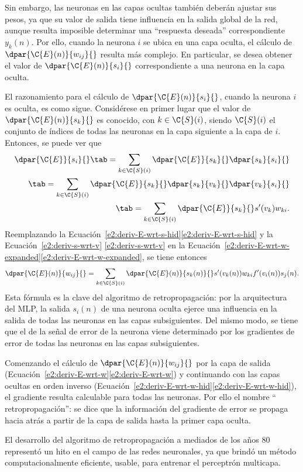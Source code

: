 Sin embargo, las neuronas en las capas ocultas también deberán ajustar
sus pesos, ya que su valor de salida tiene influencia en la salida
global de la red, aunque resulta imposible determinar una ``respuesta
deseada'' correspondiente $y_k(n)$.  Por ello, cuando la neurona $i$
se ubica en una capa oculta, el cálculo de $\dpar{\C{E}(n)}{w_{ij}}{}$
resulta más complejo.  En particular, se desea obtener el valor de
$\dpar{\C{E}(n)}{s_i}{}$ correspondiente a una neurona en la capa
oculta.

El razonamiento para el cálculo de $\dpar{\C{E}(n)}{s_{i}}{}$, cuando
la neurona $i$ es oculta, es como sigue. Considérese en primer lugar
que el valor de $\dpar{\C{E}(n)}{s_k}{}$ es conocido, con
$k\in{}\C{S}(i)$, siendo $\C{S}(i)$ el conjunto de índices de todas
las neuronas en la capa siguiente a la capa de $i$.  Entonces, se
puede ver que
%
\begin{align}
  \dpar{\C{E}}{s_i}{} \tab= \sum_{k\in\C{S}(i)}
      \dpar{\C{E}}{s_k}{}\dpar{s_k}{s_i}{} \notag\\
    \tab= \sum_{k\in\C{S}(i)}
      \dpar{\C{E}}{s_k}{}\dpar{s_k}{v_k}{}\dpar{v_k}{s_i}{} \notag\\
    \tab= \sum_{k\in\C{S}(i)} \dpar{\C{E}}{s_k}{} s'(v_k) w_{ki}.
    \label{e2:deriv-E-wrt-s-hid}
\end{align}
%
Reemplazando la
\iflatexml{}Ecuación~\ref{e2:deriv-E-wrt-s-hid}\else\autoref{e2:deriv-E-wrt-s-hid}\fi{}
y la \iflatexml{}Ecuación~\ref{e2:deriv-s-wrt-v}
\else\autoref{e2:deriv-s-wrt-v}\fi{} en la 
\iflatexml{}Ecuación~\ref{e2:deriv-E-wrt-w-expanded}\else\autoref{e2:deriv-E-wrt-w-expanded}\fi,
se tiene entonces
%
\begin{align}\label{e2:deriv-E-wrt-w-hid}
  \dpar{\C{E}(n)}{w_{ij}}{} =
  \sum_{k\in\C{S}(i)} \dpar{\C{E}(n)}{s_k(n)}{} s'(v_k(n)) w_{ki}
  f'(v_i(n)) s_j(n).
\end{align}
%
Esta fórmula es la clave del algoritmo de retropropagación: por la
arquitectura del MLP, la salida $s_i(n)$ de una neurona oculta ejerce
una influencia en la salida de todas las neuronas en las capas
subsiguientes.  Del mismo modo, se tiene que el  de
la señal de error de la neurona viene determinado por los gradientes
de error de todas las neuronas en las capas subsiguientes.

Comenzando el cálculo de $\dpar{\C{E}(n)}{w_{ij}}{}$ por la capa de
salida
(\iflatexml{}Ecuación~\ref{e2:deriv-E-wrt-w}\else\autoref{e2:deriv-E-wrt-w}\fi)
y continuando con las capas ocultas en orden inverso
(\iflatexml{}Ecuación~\ref{e2:deriv-E-wrt-w-hid}\else\autoref{e2:deriv-E-wrt-w-hid}\fi),
el gradiente resulta calculable para todas las neuronas.  Por ello el
nombre `` retropropagación'': se dice que la información del gradiente
de error se propaga hacia atrás a partir de la capa de salida hasta la
primer capa oculta.

El desarrollo del algoritmo de retropropagación a mediados de los años
80 representó un hito en el campo de las redes neuronales, ya
que brindó un método computacionalmente eficiente, usable, para
entrenar el perceptrón multicapa.
